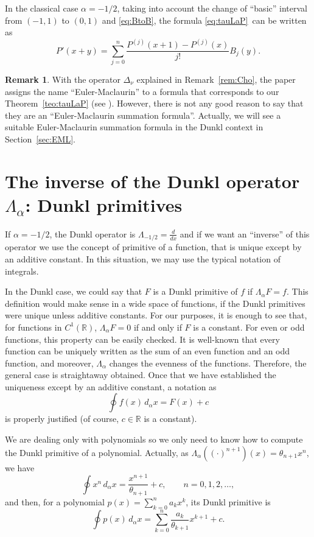 \documentclass[10pt]{article}
\theoremstyle{plain}
\theoremstyle{definition}
\newtheorem{remark}{Remark}
\numberwithin{equation}{section} %
\newcommand{\La}{\Lambda_{\alpha}}
\newcommand{\RR}{\mathbb{R}}
\begin{document}
In the classical case $\alpha=-1/2$, taking into account the change of ``basic'' interval from $(-1,1)$ to $(0,1)$ and \eqref{eq:BtoB}, the formula \eqref{eq:tauLaP}~can be written as 
\begin{equation}
\label{eq:P'x+y}
  P'(x+y) = \sum_{j=0}^n \frac{P^{(j)}(x+1) - P^{(j)}(x)}{j!} B_j(y).
\end{equation}

\begin{remark}
With the operator $\Delta_\nu$ explained in Remark~\ref{rem:Cho}, the paper~\cite{Cho} assigns the name ``Euler-Maclaurin'' to a formula that corresponds to our Theorem~\ref{teo:tauLaP} (see \cite[Theorem~16.12, p.~100]{Cho}). However, there is not any good reason to say that they are an ``Euler-Maclaurin summation formula''. Actually, we will see a suitable Euler-Maclaurin summation formula in the Dunkl context in Section~\ref{sec:EML}.
\end{remark}

\section{The inverse of the Dunkl operator $\La$: Dunkl primitives}
\label{sec:Dprim}

If $\alpha=-1/2$, the Dunkl operator is $\Lambda_{-1/2} = \frac{d}{dx}$ and if we want an ``inverse'' of this operator we use the concept of primitive of a function, that is unique except by an additive constant. In this situation, we may use the typical notation of integrals.

In the Dunkl case, we could say that $F$ is a Dunkl primitive of $f$ if $\La F = f$. This definition would make sense in a wide space of functions, if the Dunkl primitives were unique unless additive constants. For our purposes, it is enough to see that, for functions in $C^1(\RR)$, $\La F = 0$ if and only if $F$ is a constant. For even or odd functions, this property can be easily checked. It is well-known that every function can be uniquely written as the  sum of an even function and an odd function, 
and moreover, $\La$ changes the evenness of the functions. Therefore, the general case is straightaway obtained. Once that we have established the uniqueness except by an additive constant, a notation as
\[
  \oint f(x)\,d_\alpha x = F(x) + c
\]
is properly justified (of course, $c \in \RR$ is a constant).

We are dealing only with polynomials so we only need to know how to compute the Dunkl primitive of a polynomial. Actually, as $\La ((\cdot)^{n+1})(x) = \theta_{n+1} x^n$, we have
\begin{equation*}
  \oint x^n\,d_\alpha x = \frac{x^{n+1}}{\theta_{n+1}} + c, \qquad n = 0,1,2,\dots,
\end{equation*}
and then, for a polynomial $p(x) = \sum_{k=0}^{n} a_k x^k$, its Dunkl primitive is
\[
  \oint p(x)\,d_\alpha x = \sum_{k=0}^{n} \frac{a_k}{\theta_{k+1}} x^{k+1} + c.
\]
\end{document}
